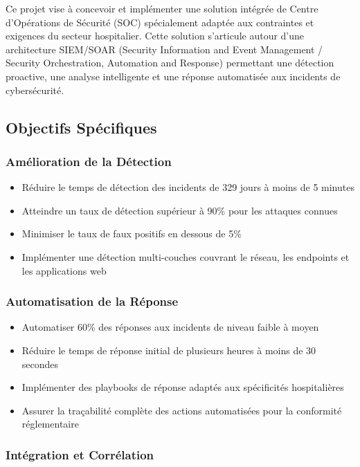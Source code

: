 Ce projet vise à concevoir et implémenter une solution intégrée de Centre d'Opérations de Sécurité (SOC) spécialement adaptée aux contraintes et exigences du secteur hospitalier. Cette solution s'articule autour d'une architecture SIEM/SOAR (Security Information and Event Management / Security Orchestration, Automation and Response) permettant une détection proactive, une analyse intelligente et une réponse automatisée aux incidents de cybersécurité.

\subsection{Objectifs Spécifiques}

\subsubsection{Amélioration de la Détection}

\begin{itemize}
    \item Réduire le temps de détection des incidents de 329 jours à moins de 5 minutes
    \item Atteindre un taux de détection supérieur à 90\% pour les attaques connues
    \item Minimiser le taux de faux positifs en dessous de 5\%
    \item Implémenter une détection multi-couches couvrant le réseau, les endpoints et les applications web
\end{itemize}

\subsubsection{Automatisation de la Réponse}

\begin{itemize}
    \item Automatiser 60\% des réponses aux incidents de niveau faible à moyen
    \item Réduire le temps de réponse initial de plusieurs heures à moins de 30 secondes
    \item Implémenter des playbooks de réponse adaptés aux spécificités hospitalières
    \item Assurer la traçabilité complète des actions automatisées pour la conformité réglementaire
\end{itemize}

\subsubsection{Intégration et Corrélation}

